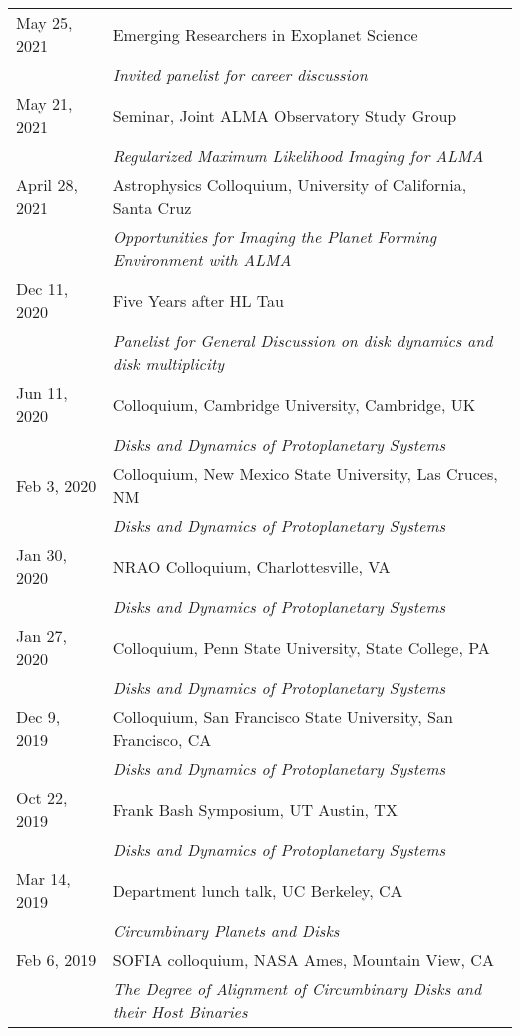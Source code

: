 \begin{longtable}{@{\hspace{10pt}}p{1.2in}l}
  May 25, 2021 & Emerging Researchers in Exoplanet Science\\
  & \emph{Invited panelist for career discussion} \\[\rowskip]
  May 21, 2021 & Seminar, Joint ALMA Observatory Study Group\\
  & \emph{Regularized Maximum Likelihood Imaging for ALMA}\\[\rowskip]
  April 28, 2021 & Astrophysics Colloquium, University of California, Santa Cruz \\
  & \emph{Opportunities for Imaging the Planet Forming Environment with ALMA} \\[\rowskip]
  Dec 11, 2020 & Five Years after HL Tau \\ 
  & \emph{Panelist for General Discussion on disk dynamics and disk multiplicity} \\[\rowskip]
  Jun 11, 2020 & Colloquium, Cambridge University, Cambridge, UK \\ 
  & \emph{Disks and Dynamics of Protoplanetary Systems} \\[\rowskip]
  Feb 3, 2020 & Colloquium, New Mexico State University, Las Cruces, NM \\
  & \emph{Disks and Dynamics of Protoplanetary Systems} \\[\rowskip]
  Jan 30, 2020 & NRAO Colloquium, Charlottesville, VA \\
  & \emph{Disks and Dynamics of Protoplanetary Systems} \\[\rowskip]
  Jan 27, 2020 & Colloquium, Penn State University, State College, PA \\
  & \emph{Disks and Dynamics of Protoplanetary Systems} \\[\rowskip]
  Dec 9, 2019 & Colloquium, San Francisco State University, San Francisco, CA \\
  & \emph{Disks and Dynamics of Protoplanetary Systems} \\[\rowskip]
  Oct 22, 2019 & Frank Bash Symposium, UT Austin, TX \\
  & \emph{Disks and Dynamics of Protoplanetary Systems} \\[\rowskip]
  Mar 14, 2019 & Department lunch talk, UC Berkeley, CA \\
  & \emph{Circumbinary Planets and Disks} \\[\rowskip]
  Feb 6, 2019 & SOFIA colloquium, NASA Ames, Mountain View, CA \\
  & \emph{The Degree of Alignment of Circumbinary Disks and their Host Binaries} \\[\rowskip]

\end{longtable}
